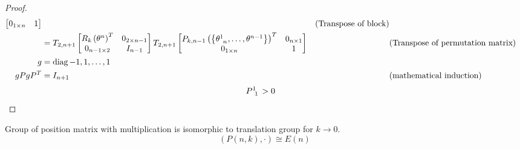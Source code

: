 \documentclass[stu, babel, american, biblatex, a4paper, leqno, draftall]{apa7}
\begin{document}
\begin{proof}
\begin{align*}
\begin{bmatrix}
            0_{1\times n}                                                                              & 1             \\
        \end{bmatrix} && \text{(Transpose of block)} \\
        &=
        T_{2,n+1}
        \begin{bmatrix}
            R_k\left(\tensor{\theta}{^n}\right)^T & 0_{{2}\times{n-1}} \\
            0_{{n-1}\times{2}}                  & {I}_{n-1}          \\
        \end{bmatrix}
        T_{2,n+1}
        \begin{bmatrix}
            P_{k,n-1}\left(\left\{\tensor{\theta}{^1_{n}},\dots,\tensor{\theta}{^{n-1}}\right\}\right)^T & 0_{n\times 1} \\
            0_{1\times n}                                                                              & 1             \\
        \end{bmatrix} && \text{(Transpose of permutation matrix)} \\
        g
        &= \diag{-1,1,\dots,1} \\
        gPgP^T
        &= I_{n+1} && \text{(mathematical induction)}
    \end{align*}
    \begin{align*}
        \tensor{P}{^1_1} &> 0
    \end{align*}
\end{proof}
\begin{proposition}
    Group of position matrix with multiplication is isomorphic to translation group for $k\to0$.
    \begin{equation*}
        \left(P\left(n, k\right),\cdot\right)\cong E\left(n\right)
    \end{equation*}
\end{proposition}
\end{document}
